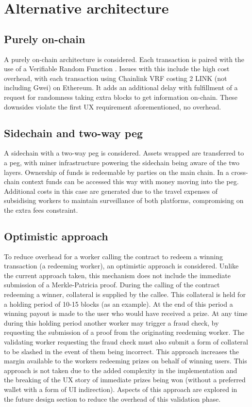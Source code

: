 
\section{Alternative architecture}

\subsection{Purely on-chain}

A purely on-chain architecture is considered. Each transaction is paired with the use of a Verifiable Random Function \cite{vrf}. Issues with this include the high cost overhead, with each transaction using Chainlink VRF \cite{link} costing 2 LINK (not including Gwei) on Ethereum. It adds an additional delay with fulfillment of a request for randomness taking extra blocks to get information on-chain. These downsides violate the first UX requirement aforementioned, no overhead.

\subsection{Sidechain and two-way peg}

A sidechain with a two-way peg is considered. Assets wrapped are transferred to a peg, with miner infrastructure powering the sidechain being aware of the two layers. Ownership of funds is redeemable by parties on the main chain. In a cross-chain context funds can be accessed this way with money moving into the peg. Additional costs in this case are generated due to the travel expenses of subsidising workers to maintain surveillance of both platforms, compromising on the extra fees constraint.

\subsection{Optimistic approach}

To reduce overhead for a worker calling the contract to redeem a winning transaction (a redeeming worker), an optimistic approach is considered. Unlike the current approach taken, this mechanism does not include the immediate submission of a Merkle-Patricia proof. During the calling of the contract redeeming a winner, collateral is supplied by the callee. This collateral is held for a holding period of 10-15 blocks (as an example). At the end of this period a winning payout is made to the user who would have received a prize. At any time during this holding period another worker may trigger a fraud check, by requesting the submission of a proof from the originating reedeming worker. The validating worker requesting the fraud check must also submit a form of collateral to be slashed in the event of them being incorrect. This approach increases the margin available to the workers redeeming prizes on behalf of winning users. This approach is not taken due to the added complexity in the implementation and the breaking of the UX story of immediate prizes being won (without a preferred wallet with a form of UI indirection). Aspects of this approach are explored in the future design section to reduce the overhead of this validation phase.

